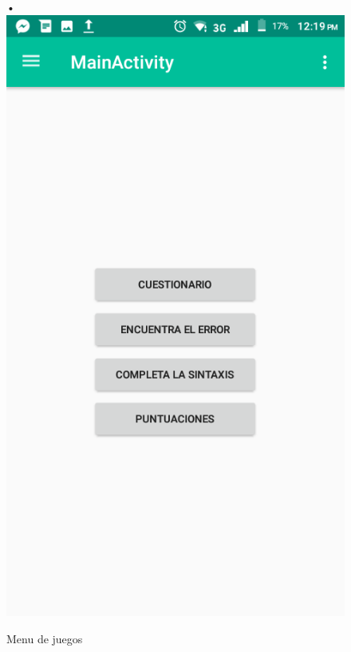 \begin{center}
\begin{figure}[H]
•\includegraphics[scale=0.3]{img/8.png} 
\caption{Menu de juegos}
\end{figure}
\end{center}
